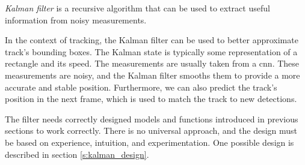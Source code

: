 \textit{Kalman filter} is a recursive algorithm that can be used to extract useful information from noisy measurements.

In the context of tracking, the Kalman filter can be used to better approximate track's bounding boxes. The Kalman state is typically some representation of a rectangle and its speed. The measurements are usually taken from a \gls{cnn}. These measurements are noisy, and the Kalman filter smooths them to provide a more accurate and stable position. Furthermore, we can also predict the track's position in the next frame, which is used to match the track to new detections. 

The filter needs correctly designed models and functions introduced in previous sections to work correctly. There is no universal approach, and the design must be based on experience, intuition, and experimentation. One possible design is described in section \ref{s:kalman_design}.
